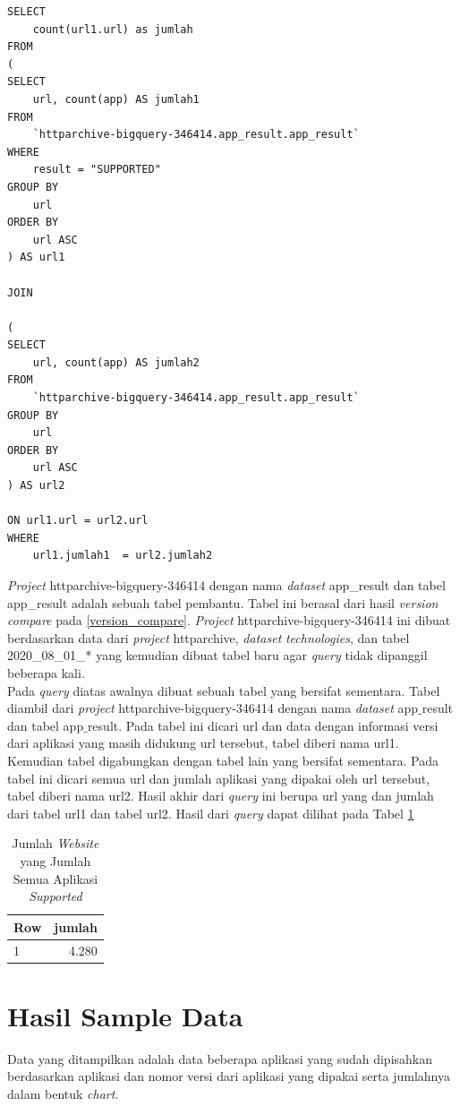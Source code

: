\begin{lstlisting}[label={lst:finalresult}, caption={Jumlah \textit{Website} yang Jumlah Semua Aplikasi \textit{Supported} }]
SELECT 
	count(url1.url) as jumlah
FROM 
(
SELECT 
	url, count(app) AS jumlah1
FROM 
	`httparchive-bigquery-346414.app_result.app_result`
WHERE 
	result = "SUPPORTED"
GROUP BY 
	url
ORDER BY 
	url ASC
) AS url1

JOIN 

(
SELECT 
	url, count(app) AS jumlah2
FROM 
	`httparchive-bigquery-346414.app_result.app_result`
GROUP BY 
	url
ORDER BY 
	url ASC
) AS url2

ON url1.url = url2.url
WHERE 
	url1.jumlah1  = url2.jumlah2 
\end{lstlisting}
\textit{Project} httparchive-bigquery-346414 dengan nama \textit{dataset} app\_result dan tabel app\_result adalah sebuah tabel pembantu. Tabel ini berasal dari hasil \textit{version compare} pada \ref{version_compare}. \textit{Project} httparchive-bigquery-346414 ini dibuat berdasarkan data dari \textit{project} httparchive, \textit{dataset} \textit{technologies}, dan tabel 2020\_08\_01\_* yang kemudian dibuat tabel baru agar \textit{query} tidak dipanggil beberapa kali. \\
Pada \textit{query} diatas awalnya dibuat sebuah tabel yang bersifat sementara. Tabel diambil dari  \textit{project} httparchive-bigquery-346414 dengan nama \textit{dataset} app$\_$result dan tabel app$\_$result. Pada tabel ini dicari url dan data dengan informasi versi dari aplikasi yang masih didukung url tersebut, tabel diberi nama url1. Kemudian tabel digabungkan dengan tabel lain yang bersifat sementara. Pada tabel ini dicari semua url dan jumlah aplikasi yang dipakai oleh url tersebut, tabel diberi nama url2. Hasil akhir dari \textit{query} ini berupa url yang dan jumlah dari tabel url1 dan tabel url2. Hasil dari \textit{query} dapat dilihat pada Tabel \ref{table:contoh_langkah451}
\begin{table}[H]
	\centering
	\begin{tabular}{|l|r|}
		\hline
		\textbf{Row} & jumlah\\
		\hline
		1 & 4.280\\
		\hline
	\end{tabular}
	\caption{Jumlah \textit{Website} yang Jumlah Semua Aplikasi \textit{Supported}}
	\label{table:contoh_langkah451}
\end{table}


\section{Hasil Sample Data}
Data yang ditampilkan adalah data beberapa aplikasi yang sudah dipisahkan berdasarkan aplikasi dan nomor versi dari aplikasi yang dipakai serta jumlahnya dalam bentuk \textit{chart}.

